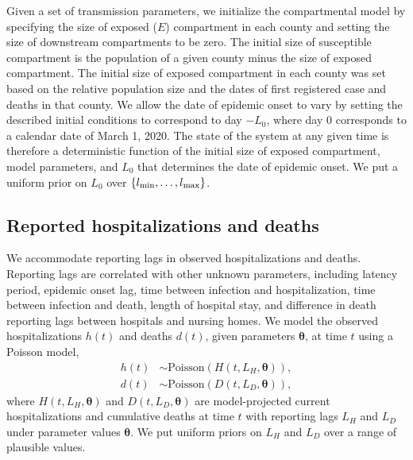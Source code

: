 \documentclass[11pt]{article}
\newcommand{\btheta}{\boldsymbol{\theta}}
\begin{document}
Given a set of transmission parameters, we initialize the compartmental model by specifying the size of exposed ($E$) compartment in each county and setting the size of downstream compartments to be zero. The initial size of susceptible compartment is the population of a given county minus the size of exposed compartment. The initial size of exposed compartment in each county was set based on the relative population size and the dates of first registered case and deaths in that county. 
We allow the date of epidemic onset to vary by setting the described initial conditions to correspond to day $-L_0$, where day $0$ corresponds to a calendar date of March 1, 2020. 
The state of the system at any given time is therefore a deterministic function of the initial size of exposed compartment, model parameters, and $L_0$ that determines the date of epidemic onset. We put a uniform prior on $L_{0}$ over $\{l\textsubscript{min}, \ldots, l\textsubscript{max}\}$.



\subsection{Reported hospitalizations and deaths} 

We accommodate reporting lags in observed hospitalizations and deaths. Reporting lags are correlated with other unknown parameters, including latency period, epidemic onset lag, time between infection and hospitalization, time between infection and death, length of hospital stay, and difference in death reporting lags between hospitals and nursing homes. We model the observed hospitalizations $h(t)$ and deaths $d(t)$, given parameters $\btheta$, at time $t$ using a Poisson model,  
\begin{align}
h(t) &\sim \mbox{Poisson}(H(t, L_H, \btheta)), \\
d(t) &\sim \mbox{Poisson}(D(t, L_D, \btheta)), 
\end{align}
where $H(t, L_H, \btheta)$ and $D(t, L_D, \btheta)$ are model-projected current hospitalizations and cumulative deaths at time $t$ with reporting lags $L_H$ and $L_D$ under parameter values $\btheta$. We put uniform priors on $L_H$ and $L_D$ over a range of plausible values. 
\end{document}
